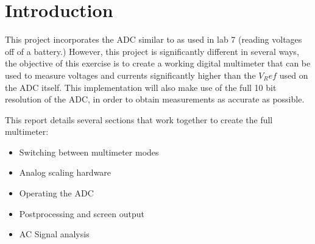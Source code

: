 \section{Introduction}



This project incorporates the ADC similar to as used in lab 7 (reading voltages off of a battery.) However, this project is significantly different in several ways, the objective of this exercise is to create a working digital multimeter that can be used to measure voltages and currents significantly higher than the $V_Ref$ used on the ADC itself. This implementation will also make use of the full 10 bit resolution of the ADC, in order to obtain measurements as accurate as possible.

This report details several sections that work together to create the full multimeter:



\begin{itemize}
\item Switching between multimeter modes
\item Analog scaling hardware
\item Operating the ADC
\item Postprocessing and screen output
\item AC Signal analysis
\end{itemize}
